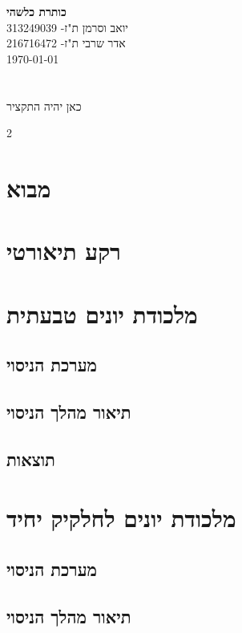 \documentclass{article}
\begin{document}
\noindent
{\LARGE \textbf{
כותרת כלשהי
}} \\[0.5cm]
{\large יואב וסרמן ת"ז- 313249039
\noindent\\
אדר שרבי ת"ז- 216716472}\\
{\large \today}\\




\section*{}

כאן יהיה התקציר 


\vspace{0.5cm}
\begin{multicols}{2}
\section*{מבוא}
\section{רקע תיאורטי}

\section{מלכודת יונים טבעתית}
\subsection{מערכת הניסוי}
\subsection{תיאור מהלך הניסוי}
\subsection{תוצאות}

\section{מלכודת יונים לחלקיק יחיד}
\subsection{מערכת הניסוי}
\subsection{תיאור מהלך הניסוי}

\end{multicols}
\end{document}
